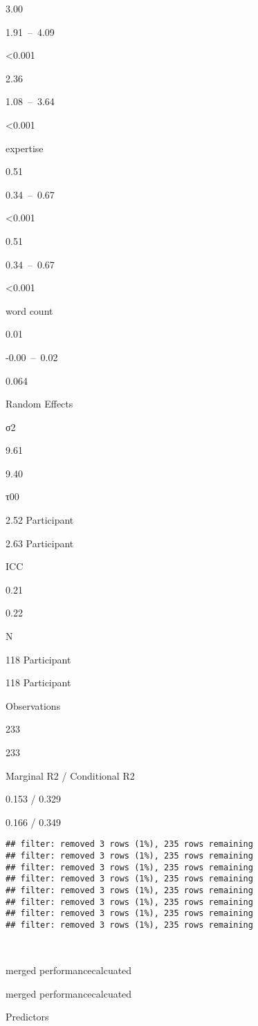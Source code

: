 \documentclass[
]{article}
\begin{document}
3.00

1.91~--~4.09

\textless0.001

2.36

1.08~--~3.64

\textless0.001

expertise

0.51

0.34~--~0.67

\textless0.001

0.51

0.34~--~0.67

\textless0.001

word count

0.01

-0.00~--~0.02

0.064

Random Effects

σ2

9.61

9.40

τ00

2.52 Participant

2.63 Participant

ICC

0.21

0.22

N

118 Participant

118 Participant

Observations

233

233

Marginal R2 / Conditional R2

0.153 / 0.329

0.166 / 0.349

\begin{verbatim}
## filter: removed 3 rows (1%), 235 rows remaining
## filter: removed 3 rows (1%), 235 rows remaining
## filter: removed 3 rows (1%), 235 rows remaining
## filter: removed 3 rows (1%), 235 rows remaining
## filter: removed 3 rows (1%), 235 rows remaining
## filter: removed 3 rows (1%), 235 rows remaining
## filter: removed 3 rows (1%), 235 rows remaining
## filter: removed 3 rows (1%), 235 rows remaining
\end{verbatim}

~

merged performancecalcuated

merged performancecalcuated

Predictors
\end{document}

